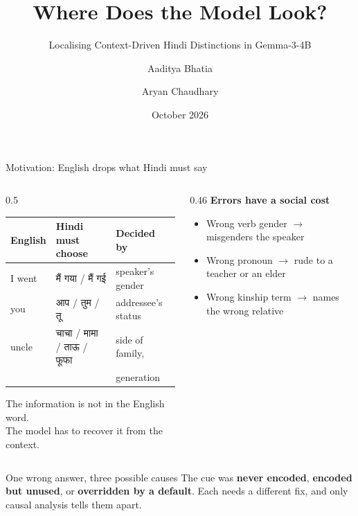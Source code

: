 \documentclass[aspectratio=169,10pt]{beamer}
\title{Where Does the Model Look?}
\subtitle{Localising Context-Driven Hindi Distinctions in Gemma-3-4B}
\author{Aaditya Bhatia \and Aryan Chaudhary}
\institute{Mechanistic Interpretability Mini-Project Proposal\\IIIT Hyderabad}
\date{October 2026}
\newcommand{\hi}[1]{{\devfont #1}}
\begin{document}
\maketitle

\begin{frame}{Motivation: English drops what Hindi must say}
\begin{columns}[T]
\begin{column}{0.5\textwidth}
\small
\begin{tabular}{@{}l l l@{}}
\toprule
\textbf{English} & \textbf{Hindi must choose} & \textbf{Decided by} \\
\midrule
I went & \hi{मैं गया} / \hi{मैं गई} & speaker's gender \\[2pt]
you & \hi{आप} / \hi{तुम} / \hi{तू} & addressee's status \\[2pt]
uncle & \hi{चाचा} / \hi{मामा} / \hi{ताऊ} / \hi{फूफा} & side of family, \\
 & & generation \\
\bottomrule
\end{tabular}

\vspace{0.8em}
The information is \alert{not in the English word}.\\
The model has to recover it from the \alert{context}.
\end{column}
\begin{column}{0.46\textwidth}
\small
\textbf{Errors have a social cost}
\begin{itemize}
  \item Wrong verb gender \(\rightarrow\) misgenders the speaker
  \item Wrong pronoun \(\rightarrow\) rude to a teacher or an elder
  \item Wrong kinship term \(\rightarrow\) names the wrong relative
\end{itemize}
\end{column}
\end{columns}
\vspace{0.8em}
\begin{block}{One wrong answer, three possible causes}
\small
The cue was \textbf{never encoded}, \textbf{encoded but unused}, or \textbf{overridden by a default}.
Each needs a different fix, and only causal analysis tells them apart.
\end{block}
\end{frame}
\end{document}
